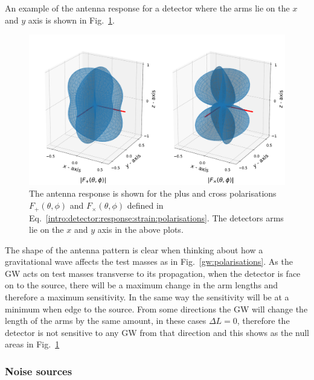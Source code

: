 An example of the antenna response for a detector where the arms lie on the $x$ and $y$ axis is shown in Fig.~\ref{intro:detector:response:polarisations}.
%
\begin{figure}[h]
    \centering
    \includegraphics[width=\textwidth]{C1_intro/antenna_pattern.pdf}
    \caption[Antenna response of the \gls{LIGO} detectors.]{The antenna
response is shown for the plus and cross polarisations $F_{+}(\theta,\phi)$ and $F_{\times}(\theta,\phi)$ defined in Eq.~\ref{intro:detector:response:strain:polarisations}. The detectors arms lie on the $x$ and
$y$ axis in the above plots. } \label{intro:detector:response:polarisations}
\end{figure}
%
The shape of the antenna pattern is clear when thinking about how a gravitational wave affects the test masses as in
Fig.~\ref{gw:polarisations}.
 As the \gls{GW} acts on test masses transverse to its propagation,
when the detector is face on to the source, there will be a maximum change in
the arm lengths and therefore a maximum sensitivity.  In the same way the
sensitivity will be at a minimum when edge to the source.
From some directions the \gls{GW} will change the length of the arms by the same amount, in these cases $\Delta L = 0$, therefore the detector is not sensitive to any \gls{GW} from that direction and this shows as the null areas in Fig.~\ref{intro:detector:response:polarisations} 



\subsubsection{\label{intro:detector:noise}Noise sources}

